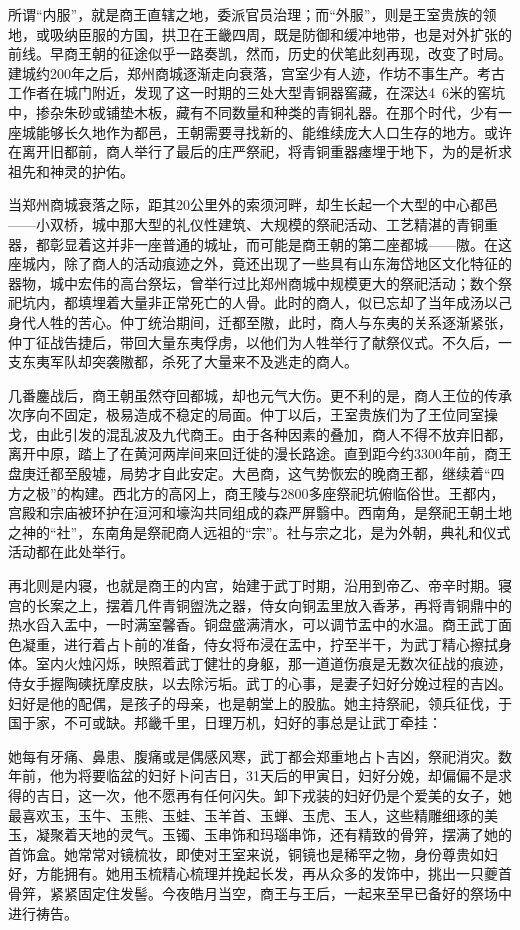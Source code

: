 所谓“内服”，就是商王直辖之地，委派官员治理；而“外服”，则是王室贵族的领地，或吸纳臣服的方国，拱卫在王畿四周，既是防御和缓冲地带，也是对外扩张的前线。早商王朝的征途似乎一路奏凯，然而，历史的伏笔此刻再现，改变了时局。建城约200年之后，郑州商城逐渐走向衰落，宫室少有人迹，作坊不事生产。考古工作者在城门附近，发现了这一时期的三处大型青铜器窖藏，在深达4~6米的窖坑中，掺杂朱砂或铺垫木板，藏有不同数量和种类的青铜礼器。在那个时代，少有一座城能够长久地作为都邑，王朝需要寻找新的、能维续庞大人口生存的地方。或许在离开旧都前，商人举行了最后的庄严祭祀，将青铜重器瘗埋于地下，为的是祈求祖先和神灵的护佑。

当郑州商城衰落之际，距其20公里外的索须河畔，却生长起一个大型的中心都邑——小双桥，城中那大型的礼仪性建筑、大规模的祭祀活动、工艺精湛的青铜重器，都彰显着这并非一座普通的城址，而可能是商王朝的第二座都城——隞。在这座城内，除了商人的活动痕迹之外，竟还出现了一些具有山东海岱地区文化特征的器物，城中宏伟的高台祭坛，曾举行过比郑州商城中规模更大的祭祀活动；数个祭祀坑内，都填埋着大量非正常死亡的人骨。此时的商人，似已忘却了当年成汤以己身代人牲的苦心。仲丁统治期间，迁都至隞，此时，商人与东夷的关系逐渐紧张，仲丁征战告捷后，带回大量东夷俘虏，以他们为人牲举行了献祭仪式。不久后，一支东夷军队却突袭隞都，杀死了大量来不及逃走的商人。

几番鏖战后，商王朝虽然夺回都城，却也元气大伤。更不利的是，商人王位的传承次序向不固定，极易造成不稳定的局面。仲丁以后，王室贵族们为了王位同室操戈，由此引发的混乱波及九代商王。由于各种因素的叠加，商人不得不放弃旧都，离开中原，踏上了在黄河两岸间来回迁徙的漫长路途。直到距今约3300年前，商王盘庚迁都至殷墟，局势才自此安定。大邑商，这气势恢宏的晚商王都，继续着“四方之极”的构建。西北方的高冈上，商王陵与2800多座祭祀坑俯临俗世。王都内，宫殿和宗庙被环护在洹河和壕沟共同组成的森严屏翳中。西南角，是祭祀王朝土地之神的“社”，东南角是祭祀商人远祖的“宗”。社与宗之北，是为外朝，典礼和仪式活动都在此处举行。

再北则是内寝，也就是商王的内宫，始建于武丁时期，沿用到帝乙、帝辛时期。寝宫的长案之上，摆着几件青铜盥洗之器，侍女向铜盂里放入香茅，再将青铜鼎中的热水舀入盂中，一时满室馨香。铜盘盛满清水，可以调节盂中的水温。商王武丁面色凝重，进行着占卜前的准备，侍女将布浸在盂中，拧至半干，为武丁精心擦拭身体。室内火烛闪烁，映照着武丁健壮的身躯，那一道道伤痕是无数次征战的痕迹，侍女手握陶磢抚摩皮肤，以去除污垢。武丁的心事，是妻子妇好分娩过程的吉凶。妇好是他的配偶，是孩子的母亲，也是朝堂上的股肱。她主持祭祀，领兵征伐，于国于家，不可或缺。邦畿千里，日理万机，妇好的事总是让武丁牵挂：

她每有牙痛、鼻患、腹痛或是偶感风寒，武丁都会郑重地占卜吉凶，祭祀消灾。数年前，他为将要临盆的妇好卜问吉日，31天后的甲寅日，妇好分娩，却偏偏不是求得的吉日，这一次，他不愿再有任何闪失。卸下戎装的妇好仍是个爱美的女子，她最喜欢玉，玉牛、玉熊、玉蛙、玉羊首、玉蝉、玉虎、玉人，这些精雕细琢的美玉，凝聚着天地的灵气。玉镯、玉串饰和玛瑙串饰，还有精致的骨笄，摆满了她的首饰盒。她常常对镜梳妆，即使对王室来说，铜镜也是稀罕之物，身份尊贵如妇好，方能拥有。她用玉梳精心梳理并挽起长发，再从众多的发饰中，挑出一只夔首骨笄，紧紧固定住发髻。今夜皓月当空，商王与王后，一起来至早已备好的祭场中进行祷告。

